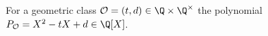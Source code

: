 For a geometric class $\mathcal O=(t,d)\in\Q\times\Q^\times$ the polynomial $P_{\mathcal O}=X^2-tX+d\in\Q[X]$.
